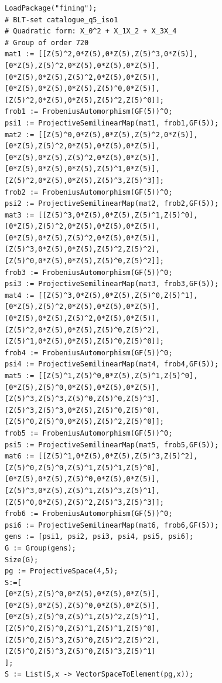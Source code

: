 \begin{verbatim}
LoadPackage("fining");
# BLT-set catalogue_q5_iso1
# Quadratic form: X_0^2 + X_1X_2 + X_3X_4
# Group of order 720
mat1 := [[Z(5)^2,0*Z(5),0*Z(5),Z(5)^3,0*Z(5)],
[0*Z(5),Z(5)^2,0*Z(5),0*Z(5),0*Z(5)],
[0*Z(5),0*Z(5),Z(5)^2,0*Z(5),0*Z(5)],
[0*Z(5),0*Z(5),0*Z(5),Z(5)^0,0*Z(5)],
[Z(5)^2,0*Z(5),0*Z(5),Z(5)^2,Z(5)^0]];
frob1 := FrobeniusAutomorphism(GF(5))^0;
psi1 := ProjectiveSemilinearMap(mat1, frob1,GF(5));
mat2 := [[Z(5)^0,0*Z(5),0*Z(5),Z(5)^2,0*Z(5)],
[0*Z(5),Z(5)^2,0*Z(5),0*Z(5),0*Z(5)],
[0*Z(5),0*Z(5),Z(5)^2,0*Z(5),0*Z(5)],
[0*Z(5),0*Z(5),0*Z(5),Z(5)^1,0*Z(5)],
[Z(5)^2,0*Z(5),0*Z(5),Z(5)^3,Z(5)^3]];
frob2 := FrobeniusAutomorphism(GF(5))^0;
psi2 := ProjectiveSemilinearMap(mat2, frob2,GF(5));
mat3 := [[Z(5)^3,0*Z(5),0*Z(5),Z(5)^1,Z(5)^0],
[0*Z(5),Z(5)^2,0*Z(5),0*Z(5),0*Z(5)],
[0*Z(5),0*Z(5),Z(5)^2,0*Z(5),0*Z(5)],
[Z(5)^3,0*Z(5),0*Z(5),Z(5)^2,Z(5)^2],
[Z(5)^0,0*Z(5),0*Z(5),Z(5)^0,Z(5)^2]];
frob3 := FrobeniusAutomorphism(GF(5))^0;
psi3 := ProjectiveSemilinearMap(mat3, frob3,GF(5));
mat4 := [[Z(5)^3,0*Z(5),0*Z(5),Z(5)^0,Z(5)^1],
[0*Z(5),Z(5)^2,0*Z(5),0*Z(5),0*Z(5)],
[0*Z(5),0*Z(5),Z(5)^2,0*Z(5),0*Z(5)],
[Z(5)^2,0*Z(5),0*Z(5),Z(5)^0,Z(5)^2],
[Z(5)^1,0*Z(5),0*Z(5),Z(5)^0,Z(5)^0]];
frob4 := FrobeniusAutomorphism(GF(5))^0;
psi4 := ProjectiveSemilinearMap(mat4, frob4,GF(5));
mat5 := [[Z(5)^1,Z(5)^0,0*Z(5),Z(5)^1,Z(5)^0],
[0*Z(5),Z(5)^0,0*Z(5),0*Z(5),0*Z(5)],
[Z(5)^3,Z(5)^3,Z(5)^0,Z(5)^0,Z(5)^3],
[Z(5)^3,Z(5)^3,0*Z(5),Z(5)^0,Z(5)^0],
[Z(5)^0,Z(5)^0,0*Z(5),Z(5)^2,Z(5)^0]];
frob5 := FrobeniusAutomorphism(GF(5))^0;
psi5 := ProjectiveSemilinearMap(mat5, frob5,GF(5));
mat6 := [[Z(5)^1,0*Z(5),0*Z(5),Z(5)^3,Z(5)^2],
[Z(5)^0,Z(5)^0,Z(5)^1,Z(5)^1,Z(5)^0],
[0*Z(5),0*Z(5),Z(5)^0,0*Z(5),0*Z(5)],
[Z(5)^3,0*Z(5),Z(5)^1,Z(5)^3,Z(5)^1],
[Z(5)^0,0*Z(5),Z(5)^2,Z(5)^3,Z(5)^3]];
frob6 := FrobeniusAutomorphism(GF(5))^0;
psi6 := ProjectiveSemilinearMap(mat6, frob6,GF(5));
gens := [psi1, psi2, psi3, psi4, psi5, psi6];
G := Group(gens);
Size(G);
pg := ProjectiveSpace(4,5);
S:=[
[0*Z(5),Z(5)^0,0*Z(5),0*Z(5),0*Z(5)],
[0*Z(5),0*Z(5),Z(5)^0,0*Z(5),0*Z(5)],
[0*Z(5),Z(5)^0,Z(5)^1,Z(5)^2,Z(5)^1],
[Z(5)^0,Z(5)^0,Z(5)^1,Z(5)^1,Z(5)^0],
[Z(5)^0,Z(5)^3,Z(5)^0,Z(5)^2,Z(5)^2],
[Z(5)^0,Z(5)^3,Z(5)^0,Z(5)^3,Z(5)^1]
];
S := List(S,x -> VectorSpaceToElement(pg,x));
\end{verbatim}
